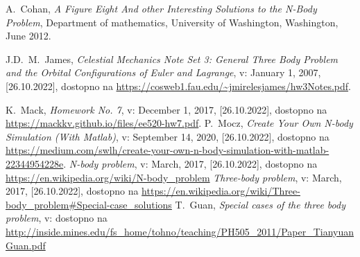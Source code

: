 \documentclass[a4paper,12pt]{article}
\begin{document}
\begin{thebibliography}{1}
 
    A.~Cohan, \emph{A Figure Eight And other Interesting Solutions to the N-Body Problem},
    Department of mathematics, University of Washington, Washington, June 2012.

    J.D.~M.~James, \emph{Celestial Mechanics Note Set 3: General Three
    Body Problem and the Orbital Configurations of
    Euler and Lagrange}, 
    v: January 1, 2007, [26.10.2022], dostopno na \url{https://cosweb1.fau.edu/~jmirelesjames/hw3Notes.pdf}.
    
    K.~Mack, \emph{Homework No. 7},
    v: December 1, 2017, [26.10.2022], dostopno na \url{https://mackkv.github.io/files/ee520-hw7.pdf}.
    P.~Mocz, \emph{Create Your Own N-body Simulation (With Matlab)},
    v: September 14, 2020, [26.10.2022], dostopno na \url{https://medium.com/swlh/create-your-own-n-body-simulation-with-matlab-22344954228e}.
    \emph{N-body problem},
    v: March, 2017, [26.10.2022], dostopno na \url{https://en.wikipedia.org/wiki/N-body_problem}
    \emph{Three-body problem},
    v: March, 2017, [26.10.2022], dostopno na \url{https://en.wikipedia.org/wiki/Three-body_problem#Special-case_solutions}
    T.~Guan, \emph{Special cases of the three body problem}, 
    v: dostopno na \url{http://inside.mines.edu/fs_home/tohno/teaching/PH505_2011/Paper_TianyuanGuan.pdf}
    
\end{thebibliography}
\end{document}
